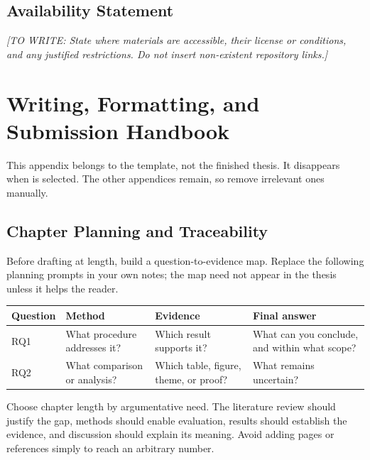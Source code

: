 \documentclass[12pt,a4paper,oneside]{report}
\newif\ifshowguidance
\newcommand{\Draft}[1]{\par\noindent\textit{[TO WRITE: #1]}\par}
\begin{document}
\section{Availability Statement}
\Draft{State where materials are accessible, their license or conditions,
and any justified restrictions. Do not insert non-existent repository links.}

\ifshowguidance
\chapter{Writing, Formatting, and Submission Handbook}
\label{app:handbook}
This appendix belongs to the template, not the finished thesis. It disappears
when \texttt{\string\showguidancefalse} is selected. The other appendices
remain, so remove irrelevant ones manually.

\section{Chapter Planning and Traceability}
Before drafting at length, build a question-to-evidence map. Replace the
following planning prompts in your own notes; the map need not appear in
the thesis unless it helps the reader.

\noindent\begin{tabularx}{\textwidth}{@{}p{}YYY@{}}
\toprule Question & Method & Evidence & Final answer\\\midrule
RQ1 & What procedure addresses it? & Which result supports it? & What can
you conclude, and within what scope?\\
RQ2 & What comparison or analysis? & Which table, figure, theme, or proof?
& What remains uncertain?\\
\bottomrule
\end{tabularx}

Choose chapter length by argumentative need. The literature review should
justify the gap, methods should enable evaluation, results should establish
the evidence, and discussion should explain its meaning. Avoid adding pages
or references simply to reach an arbitrary number.
\end{document}
